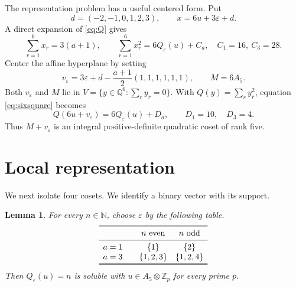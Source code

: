\documentclass[11pt]{article}
\newtheorem{lemma}[theorem]{Lemma}
\theoremstyle{remark}
\newcommand{\Z}{\mathbb Z}
\newcommand{\N}{\mathbb N}
\begin{document}
The representation problem has a useful centered form.  Put
\[
 d=(-2,-1,0,1,2,3),\qquad
 x=6u+3\varepsilon+d.
\]
A direct expansion of \eqref{eq:Q} gives
\begin{equation}\label{eq:sixsquare}
 \sum_{r=1}^6x_r=3(a+1),\qquad
 \sum_{r=1}^6x_r^2=6Q_\varepsilon(u)+C_a,
 \quad C_1=16,\ C_3=28.
\end{equation}
Center the affine hyperplane by setting
\[
 v_\varepsilon=3\varepsilon+d-\frac{a+1}{2}(1,1,1,1,1,1),
 \qquad M=6A_5.
\]
Both $v_\varepsilon$ and $M$ lie in
$V=\{y\in\mathbb Q^6:\sum_ry_r=0\}$.  With
$Q(y)=\sum_ry_r^2$, equation \eqref{eq:sixsquare} becomes
\begin{equation}\label{eq:centered}
 Q(6u+v_\varepsilon)=6Q_\varepsilon(u)+D_a,
 \qquad D_1=10,\quad D_3=4.
\end{equation}
Thus $M+v_\varepsilon$ is an integral positive-definite quadratic coset of
rank five.

\section{Local representation}

We next isolate four cosets.  We identify a binary vector with its support.

\begin{lemma}\label{lem:local}
For every $n\in\N$, choose $\varepsilon$ by the following table.
\[
\begin{array}{c@{\qquad}cc}
\toprule
 & n\text{ even} & n\text{ odd}\\
\midrule
a=1 & \{1\} & \{2\}\\
a=3 & \{1,2,3\} & \{1,2,4\}\\
\bottomrule
\end{array}
\]
Then $Q_\varepsilon(u)=n$ is soluble with $u\in A_5\otimes\Z_p$ for every
prime $p$.
\end{lemma}
\end{document}
